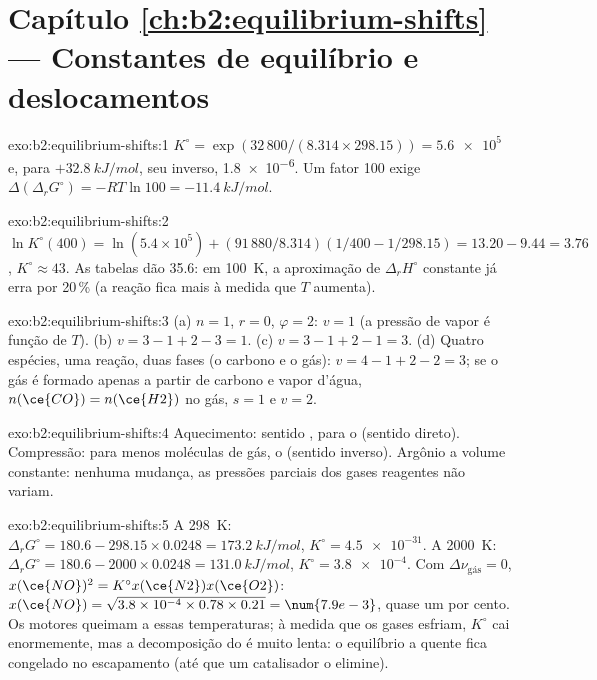 \section*{Capítulo \ref{ch:b2:equilibrium-shifts} --- Constantes de equilíbrio e deslocamentos}

\begin{solution}{exo:b2:equilibrium-shifts:1}
$K^\circ = \exp(32\,800/(8.314 \times 298.15)) = \num{5.6e5}$ e, para
$+\qty{32.8}{kJ/mol}$, seu inverso, \num{1.8e-6}. Um fator 100 exige
$\Delta(\Delta_r G^\circ) = -RT\ln 100 = \qty{-11.4}{kJ/mol}$.
\end{solution}

\begin{solution}{exo:b2:equilibrium-shifts:2}
$\ln K^\circ(400) = \ln(5.4 \times 10^5) + (91\,880/8.314)(1/400 -
1/298.15) = 13.20 - 9.44 = 3.76$, $K^\circ \approx 43$. As tabelas dão 35.6:
em \qty{100}{K}, a aproximação de $\Delta_r H^\circ$ constante já erra por
20\,\% (a reação fica mais  à medida que $T$ aumenta).
\end{solution}

\begin{solution}{exo:b2:equilibrium-shifts:3}
(a) $n = 1$, $r = 0$, $\varphi = 2$: $v = 1$ (a pressão de vapor é função
de $T$). (b) $v = 3 - 1 + 2 - 3 = 1$. (c) $v = 3 - 1 + 2 - 1 = 3$. (d) Quatro
espécies, uma reação, duas fases (o carbono e o gás): $v = 4 - 1 + 2 - 2 =
3$; se o gás é formado apenas a partir de carbono e vapor d'água, $n(\ce{CO}) = n(\ce{H2})$
no gás, $s = 1$ e $v = 2$.
\end{solution}

\begin{solution}{exo:b2:equilibrium-shifts:4}
Aquecimento: sentido , para o  (sentido direto). Compressão:
para menos moléculas de gás, o  (sentido inverso). Argônio a volume
constante: nenhuma mudança, as pressões parciais dos gases reagentes não variam.
\end{solution}

\begin{solution}{exo:b2:equilibrium-shifts:5}
A \qty{298}{K}: $\Delta_r G^\circ = 180.6 - 298.15 \times 0.0248 =
\qty{173.2}{kJ/mol}$, $K^\circ = \num{4.5e-31}$. A \qty{2000}{K}: $\Delta_r
G^\circ = 180.6 - 2000 \times 0.0248 = \qty{131.0}{kJ/mol}$, $K^\circ =
\num{3.8e-4}$. Com $\Delta\nu_{\text{gás}} = 0$, $x(\ce{NO})^2 = K^\circ x(\ce{N2})
x(\ce{O2})$: $x(\ce{NO}) = \sqrt{3.8 \times 10^{-4} \times 0.78 \times 0.21} =
\num{7.9e-3}$, quase um por cento. Os motores queimam a essas temperaturas;
à medida que os gases esfriam, $K^\circ$ cai enormemente, mas a decomposição
do  é muito lenta: o equilíbrio a quente fica congelado no
escapamento (até que um catalisador o elimine).
\end{solution}

